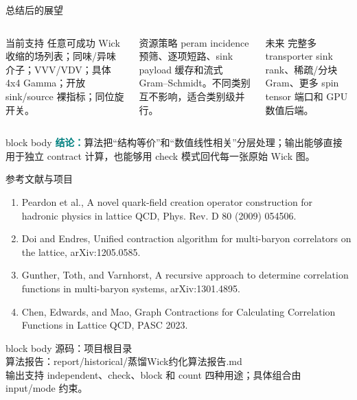 \documentclass[aspectratio=169,UTF8,fontset=fandol]{ctexbeamer}
\newcommand{\kw}[1]{\textcolor{Teal}{\textbf{#1}}}
\begin{document}
\begin{frame}{总结后的展望}
\begin{columns}[T,onlytextwidth]
\begin{block}{当前支持}
任意可成功 Wick 收缩的场列表；同味/异味介子；VVV/VDV；具体 4x4 Gamma；开放 sink/source 裸指标；同位旋开关。
\end{block}
\begin{block}{资源策略}
peram incidence 预筛、逐项短路、sink payload 缓存和流式 Gram--Schmidt。不同类别互不影响，适合类别级并行。
\end{block}
\begin{block}{未来}
完整多 transporter sink rank、稀疏/分块 Gram、更多 spin tensor 端口和 GPU 数值后端。
\end{block}
\end{columns}
\vspace{0.45em}
\begin{beamercolorbox}[sep=0.55em,wd=\linewidth]{block body}
\kw{结论：}算法把“结构等价”和“数值线性相关”分层处理；输出能够直接用于独立 contract 计算，也能够用 check 模式回代每一张原始 Wick 图。
\end{beamercolorbox}
\end{frame}
\begin{frame}[allowframebreaks]{参考文献与项目}
\small
\begin{enumerate}\itemsep0.55em
\item Peardon et al., A novel quark-field creation operator construction for hadronic physics in lattice QCD, Phys. Rev. D 80 (2009) 054506.
\item Doi and Endres, Unified contraction algorithm for multi-baryon correlators on the lattice, arXiv:1205.0585.
\item Gunther, Toth, and Varnhorst, A recursive approach to determine correlation functions in multi-baryon systems, arXiv:1301.4895.
\item Chen, Edwards, and Mao, Graph Contractions for Calculating Correlation Functions in Lattice QCD, PASC 2023.
\end{enumerate}
\vspace{0.3em}
\begin{beamercolorbox}[sep=0.55em,wd=\linewidth]{block body}
源码：项目根目录\\
算法报告：report/historical/蒸馏Wick约化算法报告.md\\
输出支持 independent、check、block 和 count 四种用途；具体组合由 input/mode 约束。
\end{beamercolorbox}
\end{frame}
\end{document}
